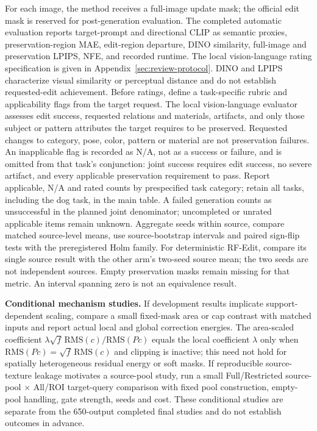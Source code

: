 For each image, the method receives a full-image update mask; the official edit mask is reserved for post-generation evaluation. The completed automatic evaluation reports target-prompt and directional CLIP as semantic proxies, preservation-region MAE, edit-region departure, DINO similarity, full-image and preservation LPIPS, NFE, and recorded runtime. The local vision-language rating specification is given in Appendix~\ref{sec:review-protocol}. DINO and LPIPS characterize visual similarity or perceptual distance and do not establish requested-edit achievement. Before ratings, define a task-specific rubric and applicability flags from the target request. The local vision-language evaluator assesses edit success, requested relations and materials, artifacts, and only those subject or pattern attributes the target requires to be preserved. Requested changes to category, pose, color, pattern or material are not preservation failures. An inapplicable flag is recorded as N/A, not as a success or failure, and is omitted from that task's conjunction: joint success requires edit success, no severe artifact, and every applicable preservation requirement to pass. Report applicable, N/A and rated counts by prespecified task category; retain all tasks, including the dog task, in the main table. A failed generation counts as unsuccessful in the planned joint denominator; uncompleted or unrated applicable items remain unknown. Aggregate seeds within source, compare matched source-level means, use source-bootstrap intervals and paired sign-flip tests with the preregistered Holm family. For deterministic RF-Edit, compare its single source result with the other arm's two-seed source mean; the two seeds are not independent sources. Empty preservation masks remain missing for that metric. An interval spanning zero is not an equivalence result.

\noindent\textbf{Conditional mechanism studies.}
If development results implicate support-dependent scaling, compare a small fixed-mask area or cap contrast with matched inputs and report actual local and global correction energies. The area-scaled coefficient $\lambda\sqrt f\,\mathrm{RMS}(c)/\mathrm{RMS}(P c)$ equals the local coefficient $\lambda$ only when $\mathrm{RMS}(Pc)=\sqrt f\,\mathrm{RMS}(c)$ and clipping is inactive; this need not hold for spatially heterogeneous residual energy or soft masks. If reproducible source-texture leakage motivates a source-pool study, run a small Full/Restricted source-pool $\times$ All/ROI target-query comparison with fixed pool construction, empty-pool handling, gate strength, seeds and cost. These conditional studies are separate from the 650-output completed final studies and do not establish outcomes in advance.

